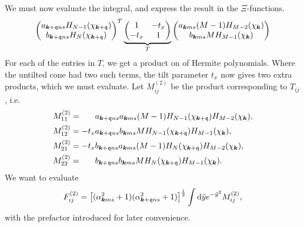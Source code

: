 We must now evaluate the integral, and express the result in the \( \Xi \)-functions.
\[
    \begin{pmatrix}
      a_{\bm{k} + \mathfrak{q} n s} H_{N-1} ( \chi _{\bm{k} + \mathfrak{q}} )\\
      b_{\bm{k} + \mathfrak{q} ns} H_N ( \chi _{\bm{k} + \mathfrak{q}} )
    \end{pmatrix}^{T}
  \underbrace{
    \begin{pmatrix}
      1 & -t_x\\
      -t_x & 1
    \end{pmatrix}
    }_{T}
    \begin{pmatrix}
      a_{\bm{k} m s} (M-1) H_{M-2} (\chi_{\bm{k}})\\
      b_{\bm{k} m s} M H_{M-1} ( \chi _{\bm{k}} )
    \end{pmatrix}
\]
For each of the entries in \( T \), we get a product on of Hermite polynomials.
Where the untilted cone had two such terms, the tilt parameter \( t _x \) now gives two extra products, which we must evaluate.
Let \( M^{(2)}_{ij} \) be the product corresponding to \( T_{ij} \), i.e.
\begin{align}
  M^{(2)}_{11} &= \phantom{-t_x} a_{\bm{k} + \mathfrak{q} ns} a_{\bm{k} ms} (M-1) H_{N-1} (\chi_{\bm{k} + \mathfrak{q}}) H_{M-2} (\chi_{\bm{k}}),\\
  M^{(2)}_{12} &= -t_x a_{\bm{k} + \mathfrak{q} ns} b_{\bm{k} ms} M H_{N-1} (\chi_{\bm{k} + \mathfrak{q}}) H_{M-1} (\chi_{\bm{k}}),\\
  M^{(2)}_{21} &= -t_x b_{\bm{k} + \mathfrak{q} ns} a_{\bm{k} ms} ( M-1 ) H_{N} (\chi_{\bm{k} + \mathfrak{q}}) H_{M-2} (\chi_{\bm{k}}),\\
  M^{(2)}_{22} &= \phantom{-t_x} b_{\bm{k} + \mathfrak{q} ns} b_{\bm{k} ms} M H_N (\chi_{\bm{k} + \mathfrak{q}}) H_{M-1} (\chi_{\bm{k}}).
\end{align}
We want to evaluate
\begin{equation}
  \label{eq:83}
  F^{(2)}_{ij} =
  \left[(\alpha_{\bm{k} m s}^2 + 1) ( \alpha _{\bm{k} + \mathfrak{q} n s}^2 + 1 )\right]^{\frac{1}{2}}
  \int \mathrm{d} \tilde{y}
  e^{-\tilde{y}^2}
  M^{(2)}_{ij},
\end{equation}
with the prefactor introduced for later convenience.

